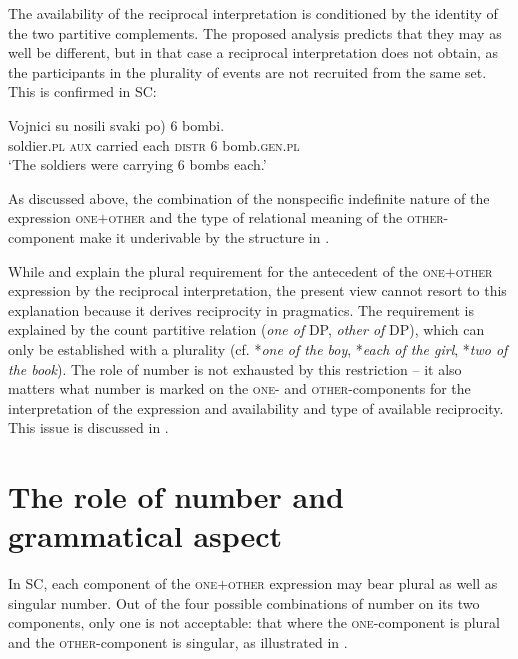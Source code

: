 \documentclass[output=paper,colorlinks,citecolor=brown]{langscibook}
\begin{document}
The availability of the reciprocal interpretation is conditioned by the identity of the two partitive complements. The proposed analysis predicts that they may as well be different, but in that case a reciprocal interpretation does not obtain, as the participants in the plurality of events are not recruited from the same set. This is confirmed in SC:

\ea\label{Vojnici3} \gll Vojnici su nosili svaki \minsp{(} po) 6 bombi.\\
 soldier.\textsc{pl} \textsc{aux} carried each {} \textsc{distr} 6 bomb.\textsc{gen.pl}\\
 \glt `The soldiers were carrying 6 bombs each.'
\z

\noindent As discussed above, the combination of the nonspecific indefinite nature of the expression \textsc{one$+$other} and the type of relational meaning of the \textsc{other}-com\-po\-nent make it underivable by the structure in .

While \citet{v10} and \citet{z14} explain the plural requirement for the antecedent of the \textsc{one$+$other} expression by the reciprocal interpretation, the present view cannot resort to this explanation because it derives reciprocity in pragmatics. The requirement is explained by the count partitive relation (\textit{one of} DP, \textit{other of} DP), which can only be established with a plurality (cf. *\textit{one of the boy}, *\textit{each of the girl},\textit{ }*\textit{two of the book}). The role of number is not exhausted by this restriction -- it also matters what number is marked on the \textsc{one}- and \textsc{other}-components for the interpretation of the expression and availability and type of available reciprocity. This issue is discussed in .

\section{The role of number and grammatical aspect}\label{sec:arsenijevic:6}

In SC, each component of the \textsc{one$+$other} expression may bear plural as well as singular number. Out of the four possible combinations of number on its two components, only one is not acceptable: that where the \textsc{one}-component is plural and the \textsc{other}-component is singular, as illustrated in .

\ea\label{Susedi3} 
\label{Susedi3-a}
\end{document}
